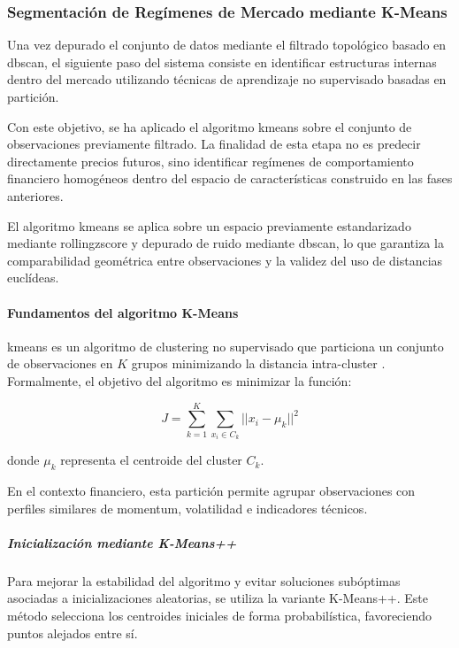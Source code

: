 \documentclass[
]{article}
\begin{document}
\subsubsection{Segmentación de Regímenes de Mercado mediante K-Means}
\label{sec:kmeans}

Una vez depurado el conjunto de datos mediante el filtrado topológico basado en \gls{dbscan}, el siguiente paso del sistema consiste en identificar estructuras internas dentro del mercado utilizando técnicas de aprendizaje no supervisado basadas en partición.

Con este objetivo, se ha aplicado el algoritmo \gls{kmeans} sobre el conjunto de observaciones previamente filtrado. La finalidad de esta etapa no es predecir directamente precios futuros, sino identificar regímenes de comportamiento financiero homogéneos dentro del espacio de características construido en las fases anteriores.

El algoritmo \gls{kmeans} se aplica sobre un espacio previamente estandarizado mediante \gls{rollingzscore} y depurado de ruido mediante \gls{dbscan}, lo que garantiza la comparabilidad geométrica entre observaciones y la validez del uso de distancias euclídeas.

\paragraph{Fundamentos del algoritmo K-Means}

\gls{kmeans} es un algoritmo de \gls{clustering} no supervisado que particiona un conjunto de observaciones en $K$ grupos minimizando la distancia intra-cluster \parencite{macqueen1967}. Formalmente, el objetivo del algoritmo es minimizar la función:

\begin{equation}
J = \sum_{k=1}^{K} \sum_{x_i \in C_k} ||x_i - \mu_k||^2
\end{equation}

donde $\mu_k$ representa el centroide del cluster $C_k$.

En el contexto financiero, esta partición permite agrupar observaciones con perfiles similares de \gls{momentum}, volatilidad e indicadores técnicos.

\subparagraph{Inicialización mediante K-Means++}

Para mejorar la estabilidad del algoritmo y evitar soluciones subóptimas asociadas a inicializaciones aleatorias, se utiliza la variante K-Means++. Este método selecciona los centroides iniciales de forma probabilística, favoreciendo puntos alejados entre sí.
\end{document}
